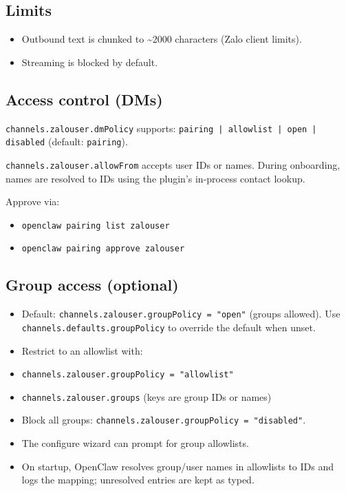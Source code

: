 \subsection{Limits}


\begin{itemize}
  \item Outbound text is chunked to \textasciitilde{}2000 characters (Zalo client limits).
  \item Streaming is blocked by default.
\end{itemize}


\subsection{Access control (DMs)}


\texttt{channels.zalouser.dmPolicy} supports: \texttt{pairing | allowlist | open | disabled} (default: \texttt{pairing}).

\texttt{channels.zalouser.allowFrom} accepts user IDs or names. During onboarding, names are resolved to IDs using the plugin's in-process contact lookup.

Approve via:

\begin{itemize}
  \item \texttt{openclaw pairing list zalouser}
  \item \texttt{openclaw pairing approve zalouser }
\end{itemize}


\subsection{Group access (optional)}


\begin{itemize}
  \item Default: \texttt{channels.zalouser.groupPolicy = "open"} (groups allowed). Use \texttt{channels.defaults.groupPolicy} to override the default when unset.
  \item Restrict to an allowlist with:
  \item \texttt{channels.zalouser.groupPolicy = "allowlist"}
  \item \texttt{channels.zalouser.groups} (keys are group IDs or names)
  \item Block all groups: \texttt{channels.zalouser.groupPolicy = "disabled"}.
  \item The configure wizard can prompt for group allowlists.
  \item On startup, OpenClaw resolves group/user names in allowlists to IDs and logs the mapping; unresolved entries are kept as typed.
\end{itemize}


